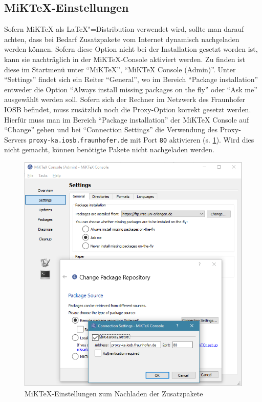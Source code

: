 \subsection{MiKTeX-Einstellungen}
\label{sec:MiKTeX}
Sofern MiKTeX als \LaTeX"=Distribution verwendet wird, sollte man darauf achten, dass bei Bedarf Zusatzpakete vom Internet dynamisch nachgeladen werden können.
Sofern diese Option nicht bei der Installation gesetzt worden ist, kann sie nachträglich in der MiKTeX-Console aktiviert werden.
Zu finden ist diese im Startmenü unter \enquote{MiKTeX}, \enquote{MiKTeX Console (Admin)}.
Unter \enquote{Settings} findet sich ein Reiter \enquote{General}, wo im Bereich \enquote{Package installation} entweder die Option \enquote{Always install missing packages on the fly} oder \enquote{Ask me} ausgewählt werden soll.
Sofern sich der Rechner im Netzwerk des Fraunhofer IOSB befindet, muss zusätzlich noch die Proxy-Option korrekt gesetzt werden.
Hierfür muss man im Bereich \enquote{Package installation} der MiKTeX Console auf \enquote{Change} gehen und bei \enquote{Connection Settings} die Verwendung des Proxy-Servers \texttt{proxy-ka.iosb.fraunhofer.de} mit Port \texttt{80} aktivieren (s. \cref{fig:MiKTeX-Proxy}).
Wird dies nicht gemacht, können benötigte Pakete nicht nachgeladen werden.

\begin{figure}[htb]%
\centering%
\includegraphics[width=\linewidth]{images/examples/MiKTeX-Proxy.png}%
\caption{MiKTeX-Einstellungen zum Nachladen der Zusatzpakete}%
\label{fig:MiKTeX-Proxy}%
\end{figure}

